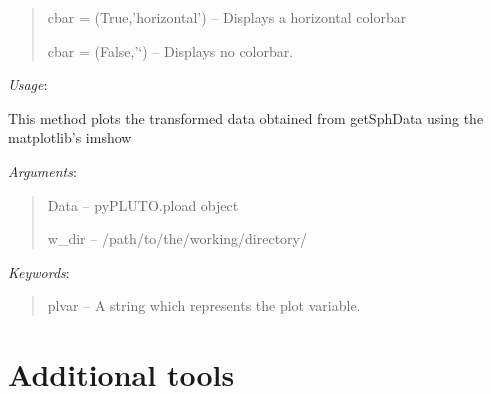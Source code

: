 \documentclass[letterpaper,10pt,english]{sphinxmanual}
\begin{document}
\begin{fulllineitems}
\begin{fulllineitems}
\begin{quote}
\begin{description}
cbar = (True,'horizontal') -- Displays a horizontal colorbar

cbar = (False,'`) -- Displays no colorbar.

\end{description}
\end{quote}

\emph{Usage}:
\begin{quote}







\end{quote}

\end{fulllineitems}


\begin{fulllineitems}
\label{image:pyPLUTO.Image.pltSphData}
This method plots the transformed data obtained from getSphData using the matplotlib's imshow

\emph{Arguments}:
\begin{quote}

Data -- pyPLUTO.pload object

w\_dir -- /path/to/the/working/directory/
\end{quote}

\emph{Keywords}:
\begin{quote}

plvar -- A string which represents the plot variable.
\end{quote}

\end{fulllineitems}


\end{fulllineitems}



\section{Additional tools}
\label{tools:additional-tools}\label{tools::doc}
\end{document}
